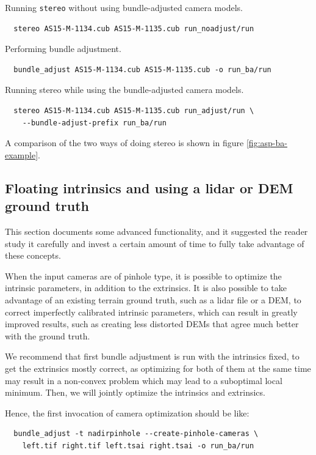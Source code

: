 Running \texttt{stereo} without using bundle-adjusted camera models.
\begin{verbatim}
  stereo AS15-M-1134.cub AS15-M-1135.cub run_noadjust/run
\end{verbatim}

Performing bundle adjustment.
\begin{verbatim}
  bundle_adjust AS15-M-1134.cub AS15-M-1135.cub -o run_ba/run
\end{verbatim}

Running stereo while using the bundle-adjusted camera models.
\begin{verbatim}
  stereo AS15-M-1134.cub AS15-M-1135.cub run_adjust/run \
    --bundle-adjust-prefix run_ba/run
\end{verbatim}

A comparison of the two ways of doing stereo is shown in figure \ref{fig:asp-ba-example}.

\subsection{Floating intrinsics and using a lidar or DEM ground truth}
\label{floatingintrinsics}

This section documents some advanced functionality, and it suggested the
reader study it carefully and invest a certain amount of time to fully
take advantage of these concepts.

When the input cameras are of pinhole type, it is possible to optimize
the intrinsic parameters, in addition to the extrinsics. It is also
possible to take advantage of an existing terrain ground truth, such as a lidar file or a DEM,
to correct imperfectly calibrated intrinsic parameters, which can result in greatly
improved results, such as creating less distorted DEMs that agree much better
with the ground truth. 

We recommend that first bundle adjustment is run with the intrinsics fixed,
to get the extrinsics mostly correct, as optimizing for both of them at
the same time may result in a non-convex problem which may lead to a 
suboptimal local minimum. Then, we will jointly optimize the intrinsics
and extrinsics. 

Hence, the first invocation of camera optimization should be like:

\begin{verbatim}
  bundle_adjust -t nadirpinhole --create-pinhole-cameras \
    left.tif right.tif left.tsai right.tsai -o run_ba/run
\end{verbatim}

